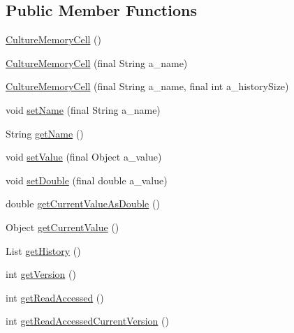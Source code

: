 \subsection*{Public Member Functions}
\begin{DoxyCompactItemize}
\item 
\hyperlink{classorg_1_1jgap_1_1distr_1_1_culture_memory_cell_acb26ec2b754f3e24fc388374c8db9cc7}{Culture\-Memory\-Cell} ()
\item 
\hyperlink{classorg_1_1jgap_1_1distr_1_1_culture_memory_cell_ae8092ac7ee9a1fa654d6a53a45c3c48a}{Culture\-Memory\-Cell} (final String a\-\_\-name)
\item 
\hyperlink{classorg_1_1jgap_1_1distr_1_1_culture_memory_cell_affa86aa63b0526039c8066893fbf2e8e}{Culture\-Memory\-Cell} (final String a\-\_\-name, final int a\-\_\-history\-Size)
\item 
void \hyperlink{classorg_1_1jgap_1_1distr_1_1_culture_memory_cell_ab2e11c64dae327c28e3c93c8b9d92512}{set\-Name} (final String a\-\_\-name)
\item 
String \hyperlink{classorg_1_1jgap_1_1distr_1_1_culture_memory_cell_adc046e5204a5954e197a994cb29401c2}{get\-Name} ()
\item 
void \hyperlink{classorg_1_1jgap_1_1distr_1_1_culture_memory_cell_a3e7bea3a898495bc7708842a6573980e}{set\-Value} (final Object a\-\_\-value)
\item 
void \hyperlink{classorg_1_1jgap_1_1distr_1_1_culture_memory_cell_aeb20ea7d6c08bee8f757d882a2b1de40}{set\-Double} (final double a\-\_\-value)
\item 
double \hyperlink{classorg_1_1jgap_1_1distr_1_1_culture_memory_cell_a5fd665dfb0d3db8594c68b48484fdd58}{get\-Current\-Value\-As\-Double} ()
\item 
Object \hyperlink{classorg_1_1jgap_1_1distr_1_1_culture_memory_cell_a564c878bfe14444efaf49ebe5b5f2f0d}{get\-Current\-Value} ()
\item 
List \hyperlink{classorg_1_1jgap_1_1distr_1_1_culture_memory_cell_ab1b3d1767e269490303f45adbdee6c7f}{get\-History} ()
\item 
int \hyperlink{classorg_1_1jgap_1_1distr_1_1_culture_memory_cell_a160c16124994dddd00ff0103611f0402}{get\-Version} ()
\item 
int \hyperlink{classorg_1_1jgap_1_1distr_1_1_culture_memory_cell_a75c54a4bbf693ca87af75251b0b19b66}{get\-Read\-Accessed} ()
\item 
int \hyperlink{classorg_1_1jgap_1_1distr_1_1_culture_memory_cell_a46739eea4ca228c498e80f9373868480}{get\-Read\-Accessed\-Current\-Version} ()

\end{DoxyCompactItemize}
